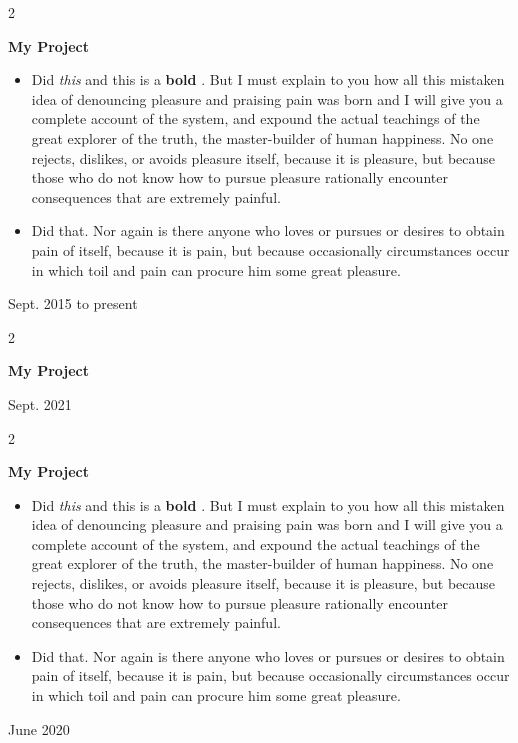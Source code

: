 \documentclass[10pt, letterpaper]{article}
\newenvironment{highlights}{
    \begin{itemize}[
        topsep=0.10 cm,
        parsep=0.10 cm,
        partopsep=0pt,
        itemsep=0pt,
        leftmargin=0.4 cm + 10pt
    ]
}{
    \end{itemize}
} %
\newenvironment{twocolentry}[2][]{
    \onecolentry
    \def\secondColumn{#2}
    \setcolumnwidth{\fill, 4.5 cm}
    \begin{paracol}{2}
}{
    \switchcolumn \raggedleft \secondColumn
    \end{paracol}
    \endonecolentry
} %
\let\hrefWithoutArrow\href
\renewcommand{\href}[2]{\hrefWithoutArrow{#1}{\mbox{\ifthenelse{\equal{#2}{}}{ }{#2 }\raisebox{.15ex}{\footnotesize \faExternalLink*}}}}
\begin{document}
        \begin{twocolentry}{
            Sept. 2015 to present
        }
            \textbf{My Project}
            \begin{highlights}
                \item Did \textit{this} and this is a \textbf{bold} \href{https://example.com}{link}. But I must explain to you how all this mistaken idea of denouncing pleasure and praising pain was born and I will give you a complete account of the system, and expound the actual teachings of the great explorer of the truth, the master-builder of human happiness. No one rejects, dislikes, or avoids pleasure itself, because it is pleasure, but because those who do not know how to pursue pleasure rationally encounter consequences that are extremely painful.
                \item Did that. Nor again is there anyone who loves or pursues or desires to obtain pain of itself, because it is pain, but because occasionally circumstances occur in which toil and pain can procure him some great pleasure.
            \end{highlights}
        \end{twocolentry}


        \vspace{0.2 cm}

        \begin{twocolentry}{
            Sept. 2021
        }
            \textbf{My Project}
        \end{twocolentry}


        \vspace{0.2 cm}

        \begin{twocolentry}{
            June 2020
        }
            \textbf{My Project}
            \begin{highlights}
                \item Did \textit{this} and this is a \textbf{bold} \href{https://example.com}{link}. But I must explain to you how all this mistaken idea of denouncing pleasure and praising pain was born and I will give you a complete account of the system, and expound the actual teachings of the great explorer of the truth, the master-builder of human happiness. No one rejects, dislikes, or avoids pleasure itself, because it is pleasure, but because those who do not know how to pursue pleasure rationally encounter consequences that are extremely painful.
                \item Did that. Nor again is there anyone who loves or pursues or desires to obtain pain of itself, because it is pain, but because occasionally circumstances occur in which toil and pain can procure him some great pleasure.
            \end{highlights}
        \end{twocolentry}
\end{document}
